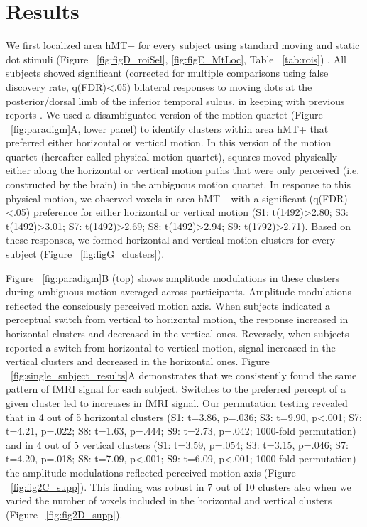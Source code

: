 \section{Results}
We first localized area hMT+ for every subject using standard moving and static dot stimuli (Figure ~\ref{fig:figD_roiSel}, \ref{fig:figE_MtLoc}, Table ~\ref{tab:rois}) \parencite{Huk2002,Emmerling2016}. All subjects showed significant (corrected for multiple comparisons using false discovery rate, q(FDR)\textless.05) bilateral responses to moving dots at the posterior/dorsal limb of the inferior temporal sulcus, in keeping with previous reports \parencite{Huk2002,Kolster2010}. We used a disambiguated version of the motion quartet (Figure ~\ref{fig:paradigm}A, lower panel) to identify clusters within area hMT+ that preferred either horizontal or vertical motion. In this version of the motion quartet (hereafter called physical motion quartet), squares moved physically either along the horizontal or vertical motion paths that were only perceived (i.e. constructed by the brain) in the ambiguous motion quartet. In response to this physical motion, we observed voxels in area hMT+ with a significant (q(FDR) \textless .05) preference for either horizontal or vertical motion (S1: t(1492)\textgreater2.80; S3: t(1492)\textgreater3.01; S7: t(1492)\textgreater2.69; S8: t(1492)\textgreater2.94; S9: t(1792)\textgreater2.71). Based on these responses, we formed horizontal and vertical motion clusters for every subject (Figure ~\ref{fig:figG_clusters}).

Figure ~\ref{fig:paradigm}B (top) shows amplitude modulations in these clusters during ambiguous motion averaged across participants. Amplitude modulations reflected the consciously perceived motion axis. When subjects indicated a perceptual switch from vertical to horizontal motion, the response increased in horizontal clusters and decreased in the vertical ones. Reversely, when subjects reported a switch from horizontal to vertical motion, signal increased in the vertical clusters and decreased in the horizontal ones. Figure ~\ref{fig:single_subject_results}A demonstrates that we consistently found the same pattern of fMRI signal for each subject. Switches to the preferred percept of a given cluster led to increases in fMRI signal. Our permutation testing revealed that in 4 out of 5 horizontal clusters (S1: t=3.86, p=.036; S3: t=9.90, p\textless.001; S7: t=4.21, p=.022; S8: t=1.63, p=.444; S9: t=2.73, p=.042; 1000-fold permutation) and in 4 out of 5 vertical clusters (S1: t=3.59, p=.054; S3: t=3.15, p=.046; S7: t=4.20, p=.018; S8: t=7.09, p\textless.001; S9: t=6.09, p\textless.001; 1000-fold permutation) the amplitude modulations reflected perceived motion axis (Figure ~\ref{fig:fig2C_supp}). This finding was robust in 7 out of 10 clusters also when we varied the number of voxels included in the horizontal and vertical clusters (Figure ~\ref{fig:fig2D_supp}).

